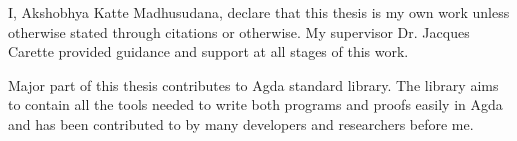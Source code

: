 
I, Akshobhya Katte Madhusudana, declare that this thesis is my own work unless
otherwise stated through citations or otherwise. My supervisor Dr. Jacques
Carette  provided guidance and support at all stages of this work.

Major part of this thesis contributes to Agda standard library. The library aims
to contain all the tools needed to write both programs and proofs easily in Agda
and has been contributed to by many developers and researchers before me.